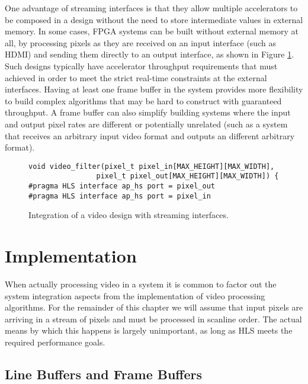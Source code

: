 One advantage of streaming interfaces is that they allow multiple accelerators to be composed in a design without the need to store intermediate values in external memory.  In some cases, FPGA systems can be built without external memory at all, by processing pixels as they are received on an input interface (such as HDMI) and sending them directly to an output interface, as shown in Figure \ref{fig:video:streaming_interface}.  Such designs typically have accelerator throughput requirements that must achieved in order to meet the strict real-time constraints at the external interfaces.   Having at least one frame buffer in the system provides more flexibility to build complex algorithms that may be hard to construct with guaranteed throughput.  A frame buffer can also simplify building systems where the input and output pixel rates are different or potentially unrelated (such as a system that receives an arbitrary input video format and outputs an different arbitrary format).

\begin{figure}
\centering
\framebox{{\tiny }}
\begin{scriptsize}
\begin{lstlisting}
void video_filter(pixel_t pixel_in[MAX_HEIGHT][MAX_WIDTH],
				pixel_t pixel_out[MAX_HEIGHT][MAX_WIDTH]) {
#pragma HLS interface ap_hs port = pixel_out
#pragma HLS interface ap_hs port = pixel_in
\end{lstlisting}
\end{scriptsize}
\caption{Integration of a video design with streaming interfaces.}\label{fig:video:streaming_interface}
\end{figure}

\section{Implementation}

When actually processing video in a system it is common to factor out the system integration aspects from the implementation of video processing algorithms.  For the remainder of this chapter we will assume that input pixels are arriving in a stream of pixels and must be processed in scanline order.  The actual means by which this happens is largely unimportant, as long as HLS meets the required performance goals. 

\subsection{Line Buffers and Frame Buffers}
\label{sec:video:buffering}

